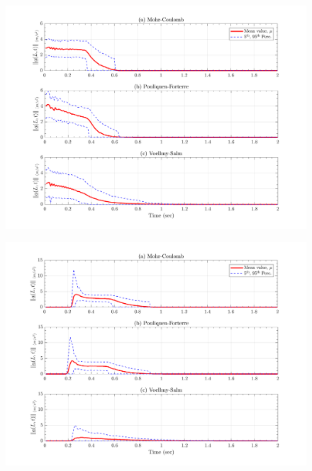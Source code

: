 \documentclass{article}
\begin{document}
\begin{figure}[H]
	\begin{minipage}[b]{0.5\linewidth}
    	\centering
    	\includegraphics[width=1\textwidth]{InclinedPlane/Acceleration/accel_L1L.png}
    	\label{fig:Ramp-L1-AccL}
	\end{minipage}
	\begin{minipage}[b]{0.5\linewidth}
		\centering
		\includegraphics[width=1\textwidth]{InclinedPlane/Acceleration/accel_L2L.png}
    	\label{fig:Ramp-L2-AccL}
    \end{minipage}


\end{figure}
\end{document}
